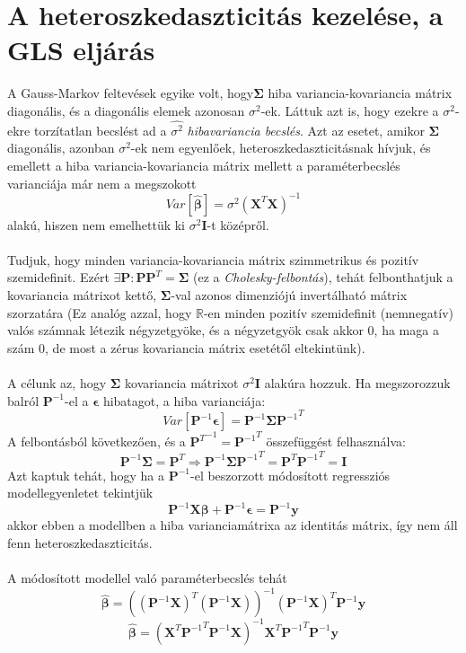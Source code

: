 \documentclass[14p]{report}
\def\pmb{\boldsymbol}
\def\ebeta{\hat{\pmb{\beta}}}
\def\e{\epsilon}
\begin{document}
	\section{A heteroszkedaszticitás kezelése, a GLS eljárás}
	A Gauss-Markov feltevések egyike volt, hogy$\pmb{\Sigma}$ hiba variancia-kovariancia mátrix diagonális, és a diagonális elemek azonosan $\sigma^2$-ek. Láttuk azt is, hogy ezekre a $\sigma^2$-ekre torzítatlan becslést ad a $\widehat{\sigma^2}$ \emph{hibavariancia becslés}. Azt az esetet, amikor $\pmb{\Sigma}$ diagonális, azonban $\sigma^2$-ek nem egyenlőek, heteroszkedaszticitásnak hívjuk, és emellett a hiba variancia-kovariancia mátrix mellett a paraméterbecslés varianciája már nem a megszokott
	\[
		Var[\ebeta] = \sigma^2(\pmb{X}^T\pmb{X})^{-1}
	\]
	alakú, hiszen nem emelhettük ki $\sigma^2\pmb{I}$-t középről.
	\\
	\\
	Tudjuk, hogy minden variancia-kovariancia mátrix szimmetrikus és pozitív szemidefinit. Ezért $\exists \pmb{P} : \pmb{P}\pmb{P}^T = \pmb{\Sigma}$ (ez a \emph{Cholesky-felbontás}), tehát felbonthatjuk a kovariancia mátrixot kettő, $\pmb{\Sigma}$-val azonos dimenziójú invertálható mátrix szorzatára (Ez analóg azzal, hogy $\mathbb{R}$-en minden pozitív szemidefinit (nemnegatív) valós számnak létezik négyzetgyöke, és a négyzetgyök csak akkor $0$, ha maga a szám $0$, de most a zérus kovariancia mátrix esetétől eltekintünk).
	\\
	\\
	A célunk az, hogy $\pmb{\Sigma}$ kovariancia mátrixot $\sigma^2\pmb{I}$ alakúra hozzuk. Ha megszorozzuk balról $\pmb{P}^{-1}$-el a $\pmb{\e}$ hibatagot, a hiba varianciája:
	\[
		Var[\pmb{P}^{-1}\pmb{\e}] = \pmb{P}^{-1}\pmb{\Sigma}{\pmb{P}^{-1}}^T
	\]
	A felbontásból következően, és a ${\pmb{P}^T}^{-1} = {\pmb{P}^{-1}}^T$ összefüggést felhasználva:
	\[
		\pmb{P}^{-1}\pmb{\Sigma} = \pmb{P}^T \Longrightarrow \pmb{P}^{-1}\pmb{\Sigma}{\pmb{P}^{-1}}^T = \pmb{P}^T{\pmb{P}^{-1}}^T = \pmb{I}
	\]
	Azt kaptuk tehát, hogy ha a $\pmb{P}^{-1}$-el beszorzott módosított regressziós modellegyenletet tekintjük
	\[
		\pmb{P}^{-1}\pmb{X}\pmb{\beta} + \pmb{P}^{-1}\pmb{\e} = \pmb{P}^{-1}\pmb{y}
	\]
	akkor ebben a modellben a hiba varianciamátrixa az identitás mátrix, így nem áll fenn heteroszkedaszticitás.
	\\
	\\
	A módosított modellel való paraméterbecslés tehát
	\[
		\ebeta = ((\pmb{P}^{-1}\pmb{X})^T(\pmb{P}^{-1}\pmb{X}))^{-1}(\pmb{P}^{-1}\pmb{X})^T\pmb{P}^{-1}\pmb{y}
	\]
	\[
		\ebeta = (\pmb{X}^T{\pmb{P}^{-1}}^T\pmb{P}^{-1}\pmb{X})^{-1}\pmb{X}^T{\pmb{P}^{-1}}^T\pmb{P}^{-1}\pmb{y}
	\]
\end{document}
